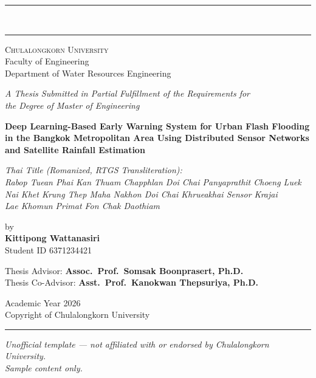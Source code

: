 \documentclass[12pt,a4paper]{report}
\begin{document}
\begin{titlepage}
\begin{center}

{\color{chulagold}\rule{\textwidth}{1.2pt}}\\[2pt]
{\color{chulapink}\rule{\textwidth}{2.4pt}}

\vspace{1.0cm}
{\large\scshape Chulalongkorn University}\\[2pt]
{\small Faculty of Engineering}\\[2pt]
{\small Department of Water Resources Engineering}

\vspace{1.6cm}
{\small\itshape A Thesis Submitted in Partial Fulfillment of the Requirements for}\\
{\small\itshape the Degree of Master of Engineering}

\vspace{1.8cm}
{\Large\bfseries\color{chulacharcoal}
Deep Learning-Based Early Warning System for Urban Flash Flooding\\[4pt]
in the Bangkok Metropolitan Area Using Distributed Sensor Networks\\[4pt]
and Satellite Rainfall Estimation}

\vspace{0.9cm}
{\normalsize\itshape\color{chulacharcoal}
Thai Title (Romanized, RTGS Transliteration):}\\[4pt]
{\small\itshape
Rabop Tuean Phai Kan Thuam Chapphlan Doi Chai Panyaprathit Choeng Luek\\
Nai Khet Krung Thep Maha Nakhon Doi Chai Khrueakhai Sensor Krajai\\
Lae Khomun Primat Fon Chak Daothiam}

\vspace{1.6cm}
{\normalsize by}\\[6pt]
{\large\bfseries Kittipong Wattanasiri}\\[2pt]
{\small Student ID 6371234421}

\vspace{1.8cm}
{\small Thesis Advisor: \bfseries Assoc.\ Prof.\ Somsak Boonprasert, Ph.D.}\\[2pt]
{\small Thesis Co-Advisor: \bfseries Asst.\ Prof.\ Kanokwan Thepsuriya, Ph.D.}

\vspace{1.8cm}
{\small Academic Year 2026}\\[2pt]
{\small Copyright of Chulalongkorn University}

\vspace{1.4cm}
{\color{chulagold}\rule{0.4\textwidth}{1pt}}

\vfill
{\scriptsize\itshape
Unofficial template --- not affiliated with or endorsed by Chulalongkorn University.\\
Sample content only.}

\end{center}
\end{titlepage}
\end{document}
